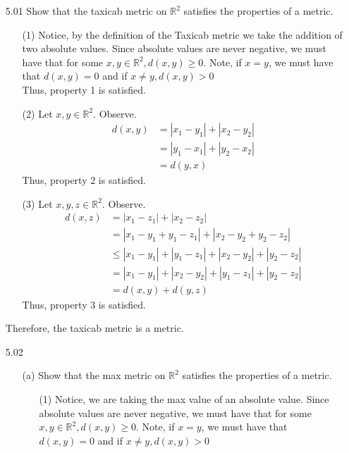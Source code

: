\documentclass[12pt]{article}
\newcommand{\R}{\mathbb{R}}
\begin{document}
\pagestyle{fancy}  
\lfoot{} \cfoot{} \rfoot{}

\begin{enumerate}

	\item[5.01] Show that the taxicab metric on $\mathbb { R } ^ { 2 }$ satisfies the properties of a metric.
	\begin{enumerate}
		\item[(1)] Notice, by the definition of the Taxicab metric we take the addition of two absolute values. Since absolute values are never negative, we must have that for some $ x,y\in \R^2 , d(x,y)\geq 0$. Note, if $ x=y $, we must have that $ d(x,y)=0 $ and if $ x\not=y, d(x,y)>0 $\\
		Thus, property 1 is satisfied.
		\item[(2)] Let $ x,y\in \R^2 $. Observe.
		\begin{align*}
			d(x,y) &= |x_1-y_1|+|x_2-y_2|\\
				   &= |y_1-x_1|+|y_2-x_2|\\
				   &= d(y,x)
		\end{align*}
		Thus, property 2 is satisfied.
		\item[(3)] Let $ x,y,z \in \R^2 $. Observe.
			\begin{align*}
				d(x,z) &= |x_1-z_1|+|x_2-z_2|\\
					   &= |x_1-y_1+y_1-z_1|+|x_2-y_2+y_2-z_2|\\
					   &\leq |x_1-y_1|+|y_1-z_1|+|x_2-y_2|+|y_2-z_2|\\
					   &=    |x_1-y_1|+|x_2-y_2|+|y_1-z_1|+|y_2-z_2|\\
					   &= d(x,y)+d(y,z)
			\end{align*}
		Thus, property 3 is satisfied.
	\end{enumerate}
	Therefore, the taxicab metric is a metric.
	\item[5.02] 
	\begin{enumerate}
		\item[(a)] Show that the max metric on $\mathbb { R } ^ { 2 }$ satisfies the properties of a metric.
		\begin{enumerate}
			\item[(1)] Notice, we are taking the max value of an absolute value. Since absolute values are never negative, we must have that for some $ x,y\in \R^2 , d(x,y)\geq 0$. Note, if $ x=y $, we must have that $ d(x,y)=0 $ and if $ x\not=y, d(x,y)>0 $\\ 

\end{enumerate}
\end{enumerate}
\end{enumerate}
\end{document}
